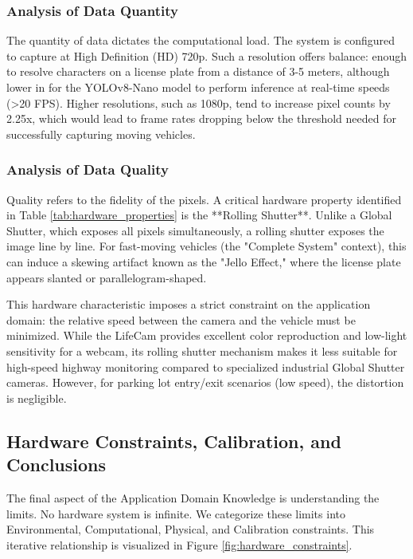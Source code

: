 \subsubsection{Analysis of Data Quantity}
The quantity of data dictates the computational load. The system is configured to capture at High Definition (HD) 720p. Such a  resolution offers balance: enough to resolve characters on a license plate from a distance of 3-5 meters, although lower in for the YOLOv8-Nano model to perform inference at real-time speeds (>20 FPS). Higher resolutions, such as 1080p, tend to increase pixel counts by 2.25x, which would lead to frame rates dropping below the threshold needed for successfully capturing moving vehicles.

\subsubsection{Analysis of Data Quality}
Quality refers to the fidelity of the pixels. A critical hardware property identified in Table \ref{tab:hardware_properties} is the **Rolling Shutter**. Unlike a Global Shutter, which exposes all pixels simultaneously, a rolling shutter exposes the image line by line. For fast-moving vehicles (the "Complete System" context), this can induce a skewing artifact known as the "Jello Effect," where the license plate appears slanted or parallelogram-shaped. 

This hardware characteristic imposes a strict constraint on the application domain: the relative speed between the camera and the vehicle must be minimized. While the LifeCam provides excellent color reproduction and low-light sensitivity for a webcam, its rolling shutter mechanism makes it less suitable for high-speed highway monitoring compared to specialized industrial Global Shutter cameras. However, for parking lot entry/exit scenarios (low speed), the distortion is negligible.

\newpage

\subsection{Hardware Constraints, Calibration, and Conclusions}

The final aspect of the Application Domain Knowledge is understanding the limits. No hardware system is infinite. We categorize these limits into Environmental, Computational, Physical, and Calibration constraints. This iterative relationship is visualized in Figure \ref{fig:hardware_constraints}.

